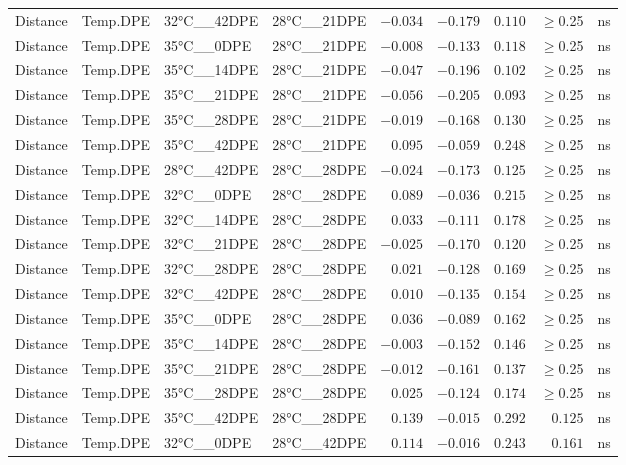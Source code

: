 \documentclass[
]{article}
\begin{document}
\begin{longtable}{llllrrrrl}
Distance & Temp.DPE & 32°C\_\_42DPE & 28°C\_\_21DPE & $-0.034$ & $-0.179$ & $0.110$ & $\geq$0.25 & ns \\ 
Distance & Temp.DPE & 35°C\_\_0DPE & 28°C\_\_21DPE & $-0.008$ & $-0.133$ & $0.118$ & $\geq$0.25 & ns \\ 
Distance & Temp.DPE & 35°C\_\_14DPE & 28°C\_\_21DPE & $-0.047$ & $-0.196$ & $0.102$ & $\geq$0.25 & ns \\ 
Distance & Temp.DPE & 35°C\_\_21DPE & 28°C\_\_21DPE & $-0.056$ & $-0.205$ & $0.093$ & $\geq$0.25 & ns \\ 
Distance & Temp.DPE & 35°C\_\_28DPE & 28°C\_\_21DPE & $-0.019$ & $-0.168$ & $0.130$ & $\geq$0.25 & ns \\ 
Distance & Temp.DPE & 35°C\_\_42DPE & 28°C\_\_21DPE & $0.095$ & $-0.059$ & $0.248$ & $\geq$0.25 & ns \\ 
Distance & Temp.DPE & 28°C\_\_42DPE & 28°C\_\_28DPE & $-0.024$ & $-0.173$ & $0.125$ & $\geq$0.25 & ns \\ 
Distance & Temp.DPE & 32°C\_\_0DPE & 28°C\_\_28DPE & $0.089$ & $-0.036$ & $0.215$ & $\geq$0.25 & ns \\ 
Distance & Temp.DPE & 32°C\_\_14DPE & 28°C\_\_28DPE & $0.033$ & $-0.111$ & $0.178$ & $\geq$0.25 & ns \\ 
Distance & Temp.DPE & 32°C\_\_21DPE & 28°C\_\_28DPE & $-0.025$ & $-0.170$ & $0.120$ & $\geq$0.25 & ns \\ 
Distance & Temp.DPE & 32°C\_\_28DPE & 28°C\_\_28DPE & $0.021$ & $-0.128$ & $0.169$ & $\geq$0.25 & ns \\ 
Distance & Temp.DPE & 32°C\_\_42DPE & 28°C\_\_28DPE & $0.010$ & $-0.135$ & $0.154$ & $\geq$0.25 & ns \\ 
Distance & Temp.DPE & 35°C\_\_0DPE & 28°C\_\_28DPE & $0.036$ & $-0.089$ & $0.162$ & $\geq$0.25 & ns \\ 
Distance & Temp.DPE & 35°C\_\_14DPE & 28°C\_\_28DPE & $-0.003$ & $-0.152$ & $0.146$ & $\geq$0.25 & ns \\ 
Distance & Temp.DPE & 35°C\_\_21DPE & 28°C\_\_28DPE & $-0.012$ & $-0.161$ & $0.137$ & $\geq$0.25 & ns \\ 
Distance & Temp.DPE & 35°C\_\_28DPE & 28°C\_\_28DPE & $0.025$ & $-0.124$ & $0.174$ & $\geq$0.25 & ns \\ 
Distance & Temp.DPE & 35°C\_\_42DPE & 28°C\_\_28DPE & $0.139$ & $-0.015$ & $0.292$ & $0.125$ & ns \\ 
Distance & Temp.DPE & 32°C\_\_0DPE & 28°C\_\_42DPE & $0.114$ & $-0.016$ & $0.243$ & $0.161$ & ns \\ 

\end{longtable}
\end{document}
